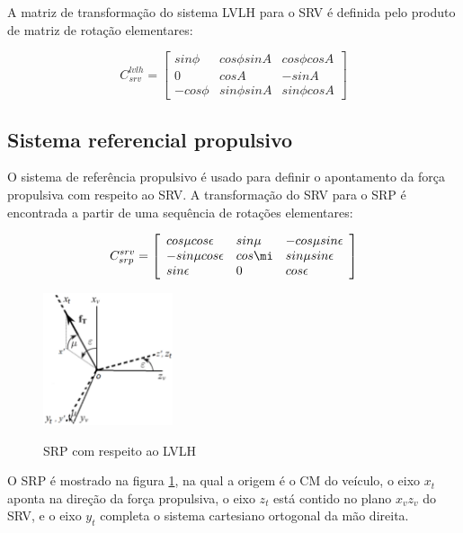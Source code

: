 A matriz de transformação do sistema LVLH para o SRV é definida pelo produto de matriz de rotação elementares:

\begin{equation}
C_{srv}^{lvlh} = 
 \left[\begin{array}{lll}
sin \phi & cos\phi sin A & cos\phi cos A \\
0 & cos A & -sinA \\
-cos \phi & sin \phi sin A & sin \phi cosA  
\end{array}\right]
\end{equation}

\subsection{Sistema referencial propulsivo}

O sistema de referência propulsivo é usado para definir o apontamento da força propulsiva com respeito ao SRV. A transformação do SRV para o SRP é encontrada a partir de uma sequência de rotações elementares:

\begin{equation}
C_{srp}^{srv} = 
 \left[\begin{array}{lll}
cos \mu cos \epsilon & sin \mu & -cos \mu sin \epsilon \\
-sin \mu cos \epsilon & cos \mi & sin \mu sin \epsilon \\
sin \epsilon & 0 & cos \epsilon  
\end{array}\right]
\end{equation}

\begin{figure}[h]
    \begin{center}
        \caption{SRP com respeito ao LVLH}
        \includegraphics[width=1.5in]{figuras/srp.png}
        \label{fig:SRP}
     \end{center}
\end{figure}

 O SRP é mostrado na figura \ref{fig:SRP}, na qual a origem é o CM do veículo, o eixo $x_{t}$ aponta na direção da força propulsiva, o eixo $z_{t}$ está contido no plano $x_{v}z_{v}$ do SRV, e o eixo $y_{t}$ completa o sistema cartesiano ortogonal da mão direita. 

